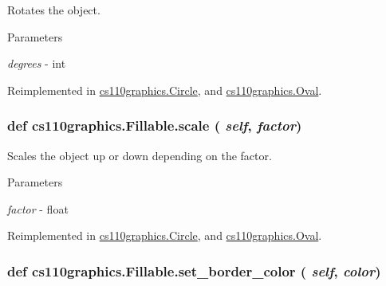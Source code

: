 Rotates the object. 
\begin{DoxyParams}{Parameters}
\item[{\em degrees}]-\/ int \end{DoxyParams}


Reimplemented in \hyperlink{classcs110graphics_1_1Circle_a0532651c10c084766ac3032c57107eb0}{cs110graphics.Circle}, and \hyperlink{classcs110graphics_1_1Oval_a98bb8103f19d2df5a875db6943fde6e2}{cs110graphics.Oval}.\hypertarget{classcs110graphics_1_1Fillable_a80d5b6b6d2ebae867dccecb803075749}{
\subsubsection[{scale}]{\setlength{\rightskip}{0pt plus 5cm}def cs110graphics.Fillable.scale ( {\em self}, \/   {\em factor})}}
\label{classcs110graphics_1_1Fillable_a80d5b6b6d2ebae867dccecb803075749}


Scales the object up or down depending on the factor. 
\begin{DoxyParams}{Parameters}
\item[{\em factor}]-\/ float \end{DoxyParams}


Reimplemented in \hyperlink{classcs110graphics_1_1Circle_a9ffed9eb3f191fafadd5b2d7e7735c18}{cs110graphics.Circle}, and \hyperlink{classcs110graphics_1_1Oval_accf5ef95d1127e0abe9f09823051d75f}{cs110graphics.Oval}.\hypertarget{classcs110graphics_1_1Fillable_a2f830be5d970faac97759910d20d68a4}{
\subsubsection[{set\_\-border\_\-color}]{\setlength{\rightskip}{0pt plus 5cm}def cs110graphics.Fillable.set\_\-border\_\-color ( {\em self}, \/   {\em color})}}
\label{classcs110graphics_1_1Fillable_a2f830be5d970faac97759910d20d68a4}


